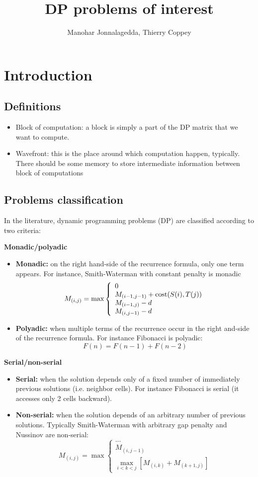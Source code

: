 \documentclass[11pt]{article}
\title{DP problems of interest}
\author{Manohar Jonnalagedda, Thierry Coppey}
\date{}
\def\ul{\begin{itemize}}
\def\ule{\end{itemize}}
\begin{document}
\maketitle
\pagestyle{headings}

\section{Introduction}
\subsection{Definitions}\ul
\item Block of computation: a block is simply a part of the DP matrix that we want to compute.
\item Wavefront: this is the place around which computation happen, typically. There should be some memory to store intermediate information between block of computations
\ule

\subsection{Problems classification}
In the literature, dynamic programming problems (DP) are classified according to two criteria:

\textbf{Monadic/polyadic}\ul
\item \textbf{Monadic:} on the right hand-side of the recurrence formula, only one term appears. For instance, Smith-Waterman with constant penalty is monadic
	\[M_{(i,j)}=\max\left\{\begin{array}{l} 0 \\ M_{(i-1,j-1)}+{\rm cost}(S(i),T(j))\\ M_{(i-1,j)}-d\\ M_{(i,j-1)}-d \end{array}\right. \]
\item \textbf{Polyadic:} when multiple terms of the recurrence occur in the right and-side of the recurrence formula. For instance Fibonacci is polyadic: \[F(n) = F(n-1) + F(n-2)\]
\ule

\textbf{Serial/non-serial} \ul
\item \textbf{Serial:} when the solution depends only of a fixed number of immediately previous solutions (i.e. neighbor cells). For instance Fibonacci is serial (it accesses only 2 cells backward).
\item \textbf{Non-serial:} when the solution depends of an arbitrary number of previous solutions. Typically Smith-Waterman with arbitrary gap penalty and Nussinov are non-serial:
	\[M_{(i,j)}=\max\left\{\begin{array}{l} ... \\ M_{(i,j-1)}\\ \max\limits_{i<k<j} [ M_{(i,k)}+M_{(k+1,j)} ] \end{array}\right. \]
\ule
\end{document}
